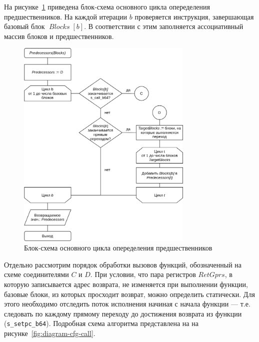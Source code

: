 \documentclass[a4paper,14pt]{extarticle}
\newcommand{\var}[1]{\mathop{\mathit{#1}}}
\begin{document}
{На рисунке~\ref{fig:diagram-cfg} приведена блок-схема основного цикла
опеределения предшественников. На каждой итерации $b$ проверяется инструкция, завершающая
базовый блок $\var{Blocks}[b]$. В соответствии с этим заполняется ассоциативный массив
блоков и предшественников.

\begin{figure}[H]
\centering
\includegraphics[width=0.75\textwidth]{diagrams/alg-cfg}
\caption{Блок-схема основного цикла опеределения предшественников}
\label{fig:diagram-cfg}
\end{figure}

Отдельно рассмотрим порядок обработки вызовов функций, обозначенный на схеме
соединителями $C$ и $D$. При условии, что пара регистров $RetGprs$, в которую
записывается адрес возврата, не изменяется при выполнении функции,
базовые блоки, из которых просходит возврат, можно определить статически.
Для этого необходимо отследить поток исполнения начиная с начала функции —
т.е. следовать по каждому прямому переходу до достижения возврата из функции
(\verb|s_setpc_b64|). Подробная схема алгоритма представлена на
на рисунке~\ref{fig:diagram-cfg-call}.

}
\end{document}
